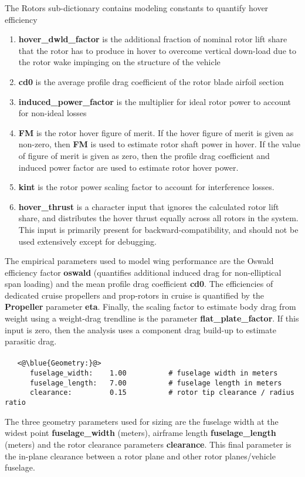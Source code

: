The Rotors sub-dictionary contains modeling constants to quantify hover efficiency
\begin{enumerate}
\item \textbf{hover\_dwld\_factor} is the additional fraction of nominal rotor lift share that the rotor has to produce in hover to overcome vertical down-load due to the rotor wake impinging on the structure of the vehicle
\item \textbf{cd0} is the average profile drag coefficient of the rotor blade airfoil section
\item \textbf{induced\_power\_factor} is the multiplier for ideal rotor power to account for non-ideal losses
\item \textbf{FM} is the rotor hover figure of merit. If the hover figure of merit is given as non-zero, then \textbf{FM} is used to estimate rotor shaft power in hover. If the value of figure of merit is given as zero, then the profile drag coefficient and induced power factor are used to estimate rotor hover power. 
\item \textbf{kint} is the rotor power scaling factor to account for interference losses. 
\item \textbf{hover\_thrust} is a character input that ignores the calculated rotor lift share, and distributes the hover thrust equally across all rotors in the system. This input is primarily present for backward-compatibility, and should not be used extensively except for debugging.
\end{enumerate}
\noindent The empirical parameters used to model wing performance are the Oswald efficiency factor \textbf{oswald} (quantifies additional induced drag for non-elliptical span loading) and the mean profile drag coefficient \textbf{cd0}. The efficiencies of dedicated cruise propellers and prop-rotors in cruise is quantified by the \textbf{Propeller} parameter \textbf{eta}. Finally, the scaling factor to estimate body drag from weight using a weight-drag trendline is the parameter \textbf{flat\_plate\_factor}. If this input is zero, then the analysis uses a component drag build-up to estimate parasitic drag.

\paragraph{}
\begin{lstlisting}
   <@\blue{Geometry:}@>
      fuselage_width:    1.00          # fuselage width in meters
      fuselage_length:   7.00          # fuselage length in meters
      clearance:         0.15          # rotor tip clearance / radius ratio
\end{lstlisting}
The three geometry parameters used for sizing are the fuselage width at the widest point \textbf{fuselage\_width} (meters), airframe length \textbf{fuselage\_length} (meters) and the rotor clearance parameters \textbf{clearance}. This final parameter is the in-plane clearance between a rotor plane and other rotor planes/vehicle fuselage.

